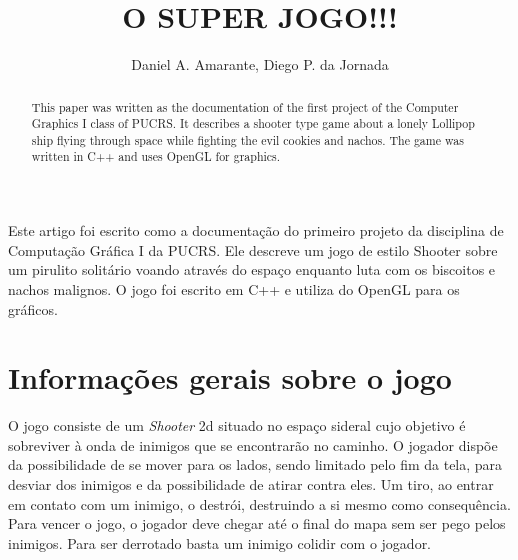 \documentclass[12pt]{article}
\title{O SUPER JOGO!!!}
\author{Daniel A. Amarante, Diego P. da Jornada}
\begin{document}
 

\maketitle

\begin{abstract}
  This paper was written as the documentation of the first project of the Computer Graphics I class of PUCRS. It describes a shooter type game about a lonely Lollipop ship flying through space while fighting the evil cookies and nachos. The game was written in C++ and uses OpenGL for graphics.
\end{abstract}
     
\begin{resumo} 
  Este artigo foi escrito como a documentação do primeiro projeto da disciplina de Computação Gráfica I da PUCRS. Ele descreve um jogo de estilo Shooter sobre um pirulito solitário voando através do espaço enquanto luta com os biscoitos e nachos malignos. O jogo foi escrito em C++ e utiliza do OpenGL para os gráficos.
\end{resumo}


\section{Informações gerais sobre o jogo}

O jogo consiste de um \emph{Shooter} 2d situado no espaço sideral cujo objetivo é sobreviver à onda de inimigos que se encontrarão no caminho. O jogador dispõe da possibilidade de se mover para os lados, sendo limitado pelo fim da tela, para desviar dos inimigos e da possibilidade de atirar contra eles. Um tiro, ao entrar em contato com um inimigo, o destrói, destruindo a si mesmo como consequência. Para vencer o jogo, o jogador deve chegar até o final do mapa sem ser pego pelos inimigos. Para ser derrotado basta um inimigo colidir com o jogador.




\end{document}
